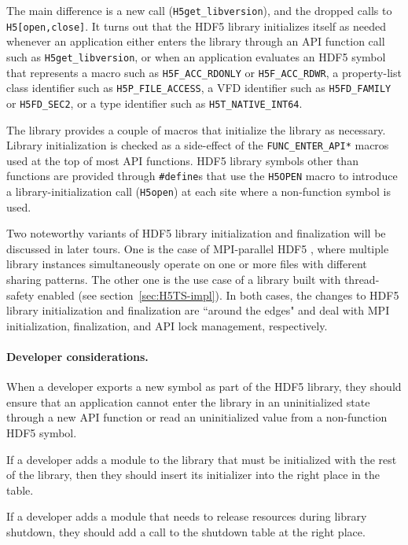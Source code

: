 The main difference is a new call (\texttt{H5get\_libversion}), and the dropped calls to \texttt{H5[open,close]}. It turns out that the HDF5 library initializes itself as needed whenever an application either enters the library through an API function call such as \texttt{H5get\_libversion}, or when an application evaluates an HDF5 symbol that represents a macro such as \texttt{H5F\_ACC\_RDONLY} or \texttt{H5F\_ACC\_RDWR}, a property-list class identifier such as \texttt{H5P\_FILE\_ACCESS}, a VFD identifier such as \texttt{H5FD\_FAMILY} or \texttt{H5FD\_SEC2}, or a type identifier
such as \texttt{H5T\_NATIVE\_INT64}.

The library provides a couple of macros that initialize the library as necessary. Library initialization is checked as a side-effect of the \texttt{FUNC\_ENTER\_API*} macros used at the top of most API functions. HDF5 library symbols other than functions are provided through \texttt{\#define}s that use the \texttt{H5OPEN} macro to introduce a library-initialization call (\texttt{H5open}) at each site where a non-function symbol is used.

Two noteworthy variants of HDF5 library initialization and finalization will be discussed in later tours. One is the case of MPI-parallel HDF5
, where multiple library instances simultaneously operate on one or more files with different sharing patterns. The other one is the use case of a library built with thread-safety enabled  (see section~\ref{sec:H5TS-impl}). In both cases, the changes to HDF5 library initialization and finalization are ``around the edges" and deal with MPI initialization, finalization, and API lock management, respectively.



\paragraph{Developer considerations.} When a developer exports a new symbol as part of the HDF5 library, they should ensure that an application cannot enter the library in an uninitialized state through a new API function or read an uninitialized value from a non-function HDF5 symbol.

If a developer adds a module to the library that must be initialized with the rest of the library, then they should insert its initializer into the right place in the table.

If a developer adds a module that needs to release resources during library shutdown, they should add a call to the shutdown table at the right place.

